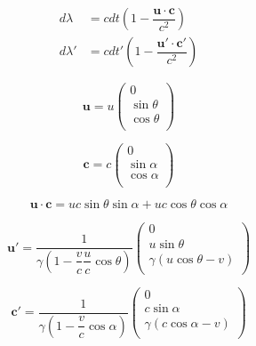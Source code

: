 \begin{equation}
	\begin{aligned}
		d\lambda  & = c dt \left( 1 - \dfrac{\mathbf{u} \cdot \mathbf{c}}{c^2} \right)    \\
		d\lambda' & = c dt' \left( 1 - \dfrac{\mathbf{u}'\cdot \mathbf{c}'}{c^2} \right)
	\end{aligned}
\end{equation}

\begin{equation}
	\mathbf{u} = u
	\begin{pmatrix}
		0          \\
		\sin\theta \\
		\cos\theta \\
	\end{pmatrix}
\end{equation}

\begin{equation}
	\mathbf{c} = c
	\begin{pmatrix}
		0          \\
		\sin\alpha \\
		\cos\alpha \\
	\end{pmatrix}
\end{equation}

\begin{equation}
	\mathbf{u} \cdot \mathbf{c} = uc  \sin\theta\sin\alpha + uc \cos\theta\cos\alpha
\end{equation}

\begin{equation}
	\mathbf{u}' = \dfrac{1}{\gamma \left(1-\dfrac{v}{c}\dfrac{u}{c}\cos\theta \right)}
	\begin{pmatrix}
		0                         \\
		u \sin\theta              \\
		\gamma (u \cos\theta - v) \\
	\end{pmatrix}
\end{equation}

\begin{equation}
	\mathbf{c}' = \dfrac{1}{\gamma \left(1-\dfrac{v}{c}\cos\alpha \right)}
	\begin{pmatrix}
		0                        \\
		c \sin\alpha             \\
		\gamma (c\cos\alpha - v) \\
	\end{pmatrix}
\end{equation}

